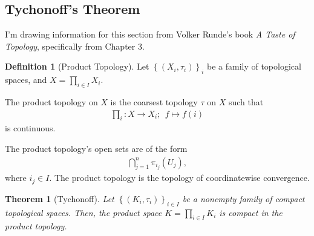 \documentclass[12pt]{extarticle}
\newcommand{\set}[1]{\left\{#1\right\}}
\theoremstyle{plain}
\newtheorem*{theorem}{Theorem}
\theoremstyle{definition}
\newtheorem*{definition}{Definition}
\theoremstyle{note}
\renewcommand{\newline}{\hfill\break}
\begin{document}
\subsection{Tychonoff's Theorem}%
I'm drawing information for this section from Volker Runde's book \textit{A Taste of Topology}, specifically from Chapter 3.
\begin{definition}[Product Topology]
  Let $\set{\left(X_{i},\tau_{i}\right)}_{i}$ be a family of topological spaces, and $\displaystyle X = \prod_{i\in I}X_i$.\newline

  The product topology on $X$ is the coarsest topology $\tau$ on $X$ such that
  \begin{align*}
    \prod_{i}: X \rightarrow X_i;~~f\mapsto f(i)
  \end{align*}
  is continuous.
\end{definition}
The product topology's open sets are of the form
\begin{align*}
  \bigcap_{j=1}^{n}\pi_{i_j}\left(U_j\right),
\end{align*}
where $i_{j}\in I$. The product topology is the topology of coordinatewise convergence.
\begin{theorem}[Tychonoff]
  Let $\set{\left(K_i,\tau_i\right)}_{i\in I}$ be a nonempty family of compact topological spaces. Then, the product space $\displaystyle K = \prod_{i\in I}K_i$ is compact in the product topology.
\end{theorem}
\end{document}
